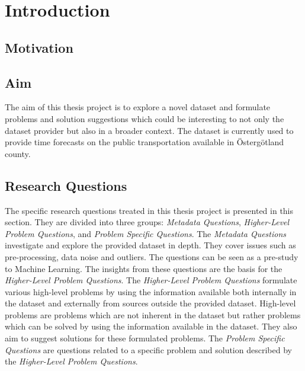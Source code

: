 \chapter{Introduction}
\label{cha:introduction}

\section{Motivation}
\label{sec:motivation}

\section{Aim}
\label{sec:aim}
The aim of this thesis project is to explore a novel dataset and formulate problems and solution suggestions which could be interesting to not only the dataset provider but also in a broader context.
The dataset is currently used to provide time forecasts on the public transportation available in Östergötland county.



\section{Research Questions}
\label{sec:research-questions}
The specific research questions treated in this thesis project is presented in this section.
They are divided into three groups: \textit{Metadata Questions}, \textit{Higher-Level Problem Questions}, and \textit{Problem Specific Questions}.
The \textit{Metadata Questions} investigate and explore the provided dataset in depth.
They cover issues such as pre-processing, data noise and outliers.
The questions can be seen as a pre-study to Machine Learning.
The insights from these questions are the basis for the \textit{Higher-Level Problem Questions}.
The \textit{Higher-Level Problem Questions} formulate various high-level problems by using the information available both internally in the dataset and externally from sources outside the provided dataset.
High-level problems are problems which are not inherent in the dataset but rather problems which can be solved by using the information available in the dataset.
They also aim to suggest solutions for these formulated problems.
The \textit{Problem Specific Questions} are questions related to a specific problem and solution described by the \textit{Higher-Level Problem Questions}.

